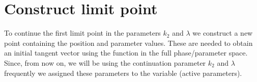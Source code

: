 \documentclass[letterpaper,10pt,english]{jupyterBook}
\begin{document}
\begin{sphinxVerbatim}[commandchars=\\\{\}]
\PYG{p}{[}\PYG{p}{]}
\end{sphinxVerbatim}

\noindent{}


\section{Construct limit point}
\label{\detokenize{CO-oxidation:construct-limit-point}}
\sphinxAtStartPar
To continue the first limit point in the parameters \(k_2\) and \(\lambda\) we
construct a new point  containing the position and parameter values. These
are needed to obtain an initial tangent vector \sphinxhyphen{} using the function
 \sphinxhyphen{} in the full phase/parameter space. Since, from now on, we will
be using the continuation parameter \(k_2\) and \(\lambda\) frequently we assigned
these parameters to the variable  (active parameters).
\end{document}
